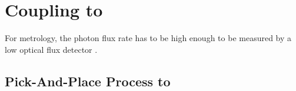 
\section[VCSELs]{Coupling \Nds to \Vcsels} \label{sec::coupling_vcsel}

For metrology, the photon flux rate has to be high enough to be measured by a low optical flux detector \cite{Vaigu2017}.

	\subsection{Pick-And-Place Process to \Vcsel}

	\begin{figure}[tp]
		\begin{subfigure}[t]{ 0.49\linewidth}
			\centering
			\caption{}
			\label{subfig::vcsel_sem_big_overview}
		\end{subfigure}
		\hfill
		\begin{subfigure}[t]{ 0.49\linewidth}
			\centering

\end{subfigure}
\end{figure}

